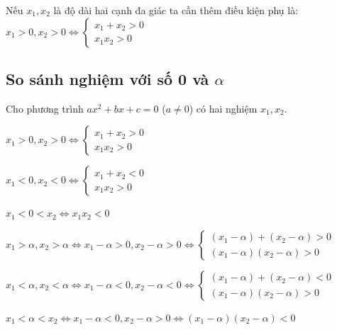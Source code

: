 \documentclass[12pt,a4paper]{extarticle}
\begin{document}
\vspace{0.8em}
\noindent Nếu $x_1, x_2$ là độ dài hai cạnh đa giác ta cần thêm điều kiện phụ là: $x_1 > 0, x_2 > 0 \iff \begin{cases} x_1 + x_2 > 0 \\ x_1x_2 > 0 \end{cases}$
\subsection{So sánh nghiệm với số 0 và \texorpdfstring{$\alpha$}{alpha}}
\vspace{0.5em}

\noindent Cho phương trình $ax^2 + bx + c = 0$ ($a \neq 0$) có hai nghiệm $x_1, x_2$.

\vspace{1em}
\noindent $x_1 > 0, x_2 > 0 \iff \begin{cases} x_1 + x_2 > 0 \\ x_1x_2 > 0 \end{cases}$

\vspace{1em}
\noindent $x_1 < 0, x_2 < 0 \iff \begin{cases} x_1 + x_2 < 0 \\ x_1x_2 > 0 \end{cases}$

\vspace{1em}
\noindent $x_1 < 0 < x_2 \iff x_1x_2 < 0$

\vspace{1em}
\noindent $x_1 > \alpha, x_2 > \alpha \iff x_1 - \alpha > 0, x_2 - \alpha > 0 \iff \begin{cases} (x_1 - \alpha) + (x_2 - \alpha) > 0 \\ (x_1 - \alpha)(x_2 - \alpha) > 0 \end{cases}$

\vspace{1em}
\noindent $x_1 < \alpha, x_2 < \alpha \iff x_1 - \alpha < 0, x_2 - \alpha < 0 \iff \begin{cases} (x_1 - \alpha) + (x_2 - \alpha) < 0 \\ (x_1 - \alpha)(x_2 - \alpha) > 0 \end{cases}$

\vspace{1em}
\noindent $x_1 < \alpha < x_2 \iff x_1 - \alpha < 0, x_2 - \alpha > 0 \iff (x_1 - \alpha)(x_2 - \alpha) < 0$

\vspace{1em}
\end{document}
